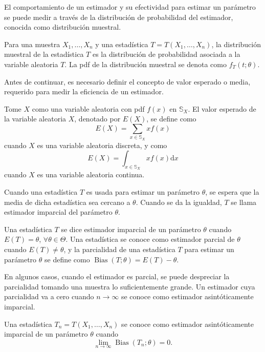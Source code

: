 		El comportamiento de un estimador y su efectividad para estimar un parámetro se puede medir a través de la distribución de probabilidad del estimador, conocida como distribución muestral.
		
		\begin{defi}
			Para una muestra $X_1,\dots, X_n$ y una estadística $T=T(X_1,\dots,X_n)$, la distribución muestral de la estadística $T$ es la distribución de probabilidad asociada a la variable aleatoria $T$. La pdf de la distribución muestral se denota como $f_T(t;\theta)$.
		
		\end{defi}
		Antes de continuar, es necesario definir el concepto de valor esperado o media, requerido para medir la eficiencia de un estimador.
		
		\begin{defi}
			Tome $X$ como una variable aleatoria con pdf $f(x)$ en $\mathbb{S}_X$. El valor esperado de la variable aleatoria $X$, denotado por $E(X)$, se define como 
			$$E(X)=\sum_{x\in\mathbb{S}_X} xf(x)$$
			cuando $X$ es una variable aleatoria discreta, y como
			$$E(X)=\int_{x\in\mathbb{S}_X} xf(x)\mathrm{d}x$$
			cuando $X$ es una variable aleatoria continua.
		\end{defi}
Cuando una estadística $T$ es usada para estimar un parámetro $\theta$, se espera que la media de dicha estadística sea cercano a $\theta$. Cuando se da la igualdad, $T$ se llama estimador imparcial del parámetro $\theta$.

	\begin{defi}
		Una estadística $T$ se dice estimador imparcial de un parámetro $\theta$ cuando $E(T)=\theta$, $\forall \theta\in\Theta$. Una estadística se conoce como estimador parcial de $\theta$ cuando $E(T)\neq \theta$, y la parcialidad de una estadística $T$ para estimar un parámetro $\theta$ se define como  $\mathop{Bias}(T;\theta)=E(T)-\theta.$ 
	\end{defi}
	
	En algunos casos, cuando el estimador es parcial, se puede despreciar la parcialidad tomando una muestra lo suficientemente grande. Un estimador cuya parcialidad va a cero cuando $n\rightarrow\infty$ se conoce como estimador asintóticamente imparcial.
	
	\begin{defi}
		Una estadística $T_n=T(X_1,\dots,X_n)$ se conoce como estimador asintóticamente imparcial de un parámetro $\theta$ cuando $$\lim_{n\rightarrow\infty}\mathop{Bias}(T_n;\theta)=0.$$
	\end{defi}
	
